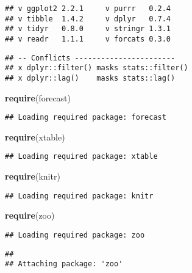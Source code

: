 \documentclass[]{article}
\newenvironment{Shaded}{\begin{snugshade}}{\end{snugshade}}
\newcommand{\KeywordTok}[1]{\textcolor[rgb]{0.13,0.29,0.53}{\textbf{#1}}}
\newcommand{\NormalTok}[1]{#1}
\begin{document}
\begin{verbatim}
## v ggplot2 2.2.1     v purrr   0.2.4
## v tibble  1.4.2     v dplyr   0.7.4
## v tidyr   0.8.0     v stringr 1.3.1
## v readr   1.1.1     v forcats 0.3.0
\end{verbatim}

\begin{verbatim}
## -- Conflicts -----------------------
## x dplyr::filter() masks stats::filter()
## x dplyr::lag()    masks stats::lag()
\end{verbatim}

\begin{Shaded}
\begin{Highlighting}[]
\KeywordTok{require}\NormalTok{(forecast)}
\end{Highlighting}
\end{Shaded}

\begin{verbatim}
## Loading required package: forecast
\end{verbatim}

\begin{Shaded}
\begin{Highlighting}[]
\KeywordTok{require}\NormalTok{(xtable)}
\end{Highlighting}
\end{Shaded}

\begin{verbatim}
## Loading required package: xtable
\end{verbatim}

\begin{Shaded}
\begin{Highlighting}[]
\KeywordTok{require}\NormalTok{(knitr)}
\end{Highlighting}
\end{Shaded}

\begin{verbatim}
## Loading required package: knitr
\end{verbatim}

\begin{Shaded}
\begin{Highlighting}[]
\KeywordTok{require}\NormalTok{(zoo)}
\end{Highlighting}
\end{Shaded}

\begin{verbatim}
## Loading required package: zoo
\end{verbatim}

\begin{verbatim}
## 
## Attaching package: 'zoo'
\end{verbatim}
\end{document}
